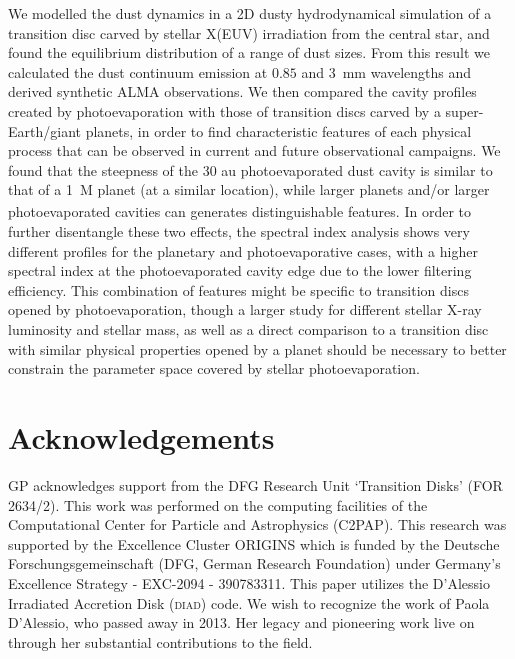 \documentclass[fleqn,usenatbib]{mnras}
\begin{document}
We modelled the dust dynamics in a 2D dusty hydrodynamical simulation of a transition disc carved by stellar X(EUV) irradiation from the central star, and found the equilibrium distribution of a range of dust sizes.
From this result we calculated the dust continuum emission at $0.85$ and \SI{3}{mm} wavelengths and derived synthetic ALMA observations. We then compared the cavity profiles created by photoevaporation with those of transition discs carved by a super-Earth/giant planets, in order to find characteristic features of each physical process that can be observed in current and future observational campaigns.
We found that the steepness of the 30 au photoevaporated dust cavity is similar to that of a \SI{1}{M_} planet (at a similar location), while larger planets and/or larger photoevaporated cavities can generates distinguishable features.
In order to further disentangle these two effects, the spectral index analysis shows very different profiles for the planetary and photoevaporative cases, with a higher spectral index at the photoevaporated cavity edge due to the lower filtering efficiency.
This combination of features might be specific to transition discs opened by photoevaporation, though a larger study for different stellar X-ray luminosity and stellar mass, as well as a direct comparison to a transition disc with similar physical properties opened by a planet should be necessary to better constrain the parameter space covered by stellar photoevaporation.

\section*{Acknowledgements}
GP acknowledges support from the DFG Research Unit ‘Transition Disks’ (FOR 2634/2).
This work was performed on the computing facilities of the Computational Center for Particle and Astrophysics (C2PAP).
This research was supported by the Excellence Cluster ORIGINS which is funded by the Deutsche Forschungsgemeinschaft (DFG, German Research Foundation) under Germany's Excellence Strategy - EXC-2094 - 390783311.
This paper utilizes the D’Alessio Irradiated Accretion Disk (\textsc{diad}) code. We wish to recognize the work of Paola D’Alessio, who passed away in 2013. Her legacy and pioneering work live on through her substantial contributions to the field.
\end{document}
